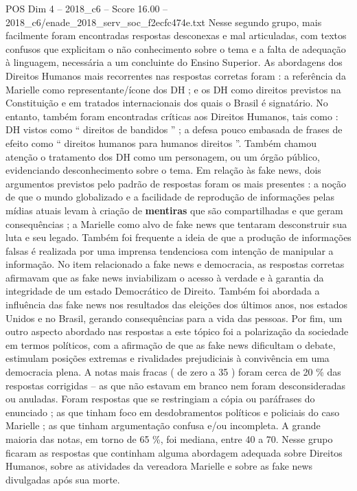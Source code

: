\begin{textsample}{POS Dim 4 – 2018\_c6 – Score 16.00 – 2018\_c6/enade\_2018\_serv\_soc\_f2ecfc474e.txt}
Nesse segundo grupo, mais facilmente foram encontradas respostas desconexas e mal articuladas, com textos confusos que explicitam o não conhecimento sobre o tema e a falta de adequação à linguagem, necessária a um concluinte do Ensino Superior.
As abordagens dos Direitos Humanos mais recorrentes nas respostas corretas foram : a referência da Marielle como representante/ícone dos DH ; e os DH como direitos previstos na Constituição e em tratados internacionais dos quais o Brasil é signatário.
No entanto, também foram encontradas críticas aos Direitos Humanos, tais como : DH vistos como “ direitos de bandidos ” ; a defesa pouco embasada de frases de efeito como “ direitos humanos para humanos direitos ”.
Também chamou atenção o tratamento dos DH como um personagem, ou um órgão público, evidenciando desconhecimento sobre o tema.
Em relação às fake news, dois argumentos previstos pelo padrão de respostas foram os mais presentes : a noção de que o mundo globalizado e a facilidade de reprodução de informações pelas mídias atuais levam à criação de \textbf{mentiras} que são compartilhadas e que geram consequências ; a Marielle como alvo de fake news que tentaram desconstruir sua luta e seu legado.
Também foi frequente a ideia de que a produção de informações falsas é realizada por uma imprensa tendenciosa com intenção de manipular a informação.
No item relacionado a fake news e democracia, as respostas corretas afirmavam que as fake news inviabilizam o acesso à verdade e à garantia da integridade de um estado Democrático de Direito.
Também foi abordada a influência das fake news nos resultados das eleições dos últimos anos, nos estados Unidos e no Brasil, gerando consequências para a vida das pessoas.
Por fim, um outro aspecto abordado nas respostas a este tópico foi a polarização da sociedade em termos políticos, com a afirmação de que as fake news dificultam o debate, estimulam posições extremas e rivalidades prejudiciais à convivência em uma democracia plena.
A notas mais fracas ( de zero a 35 ) foram cerca de 20 \% das respostas corrigidas – as que não estavam em branco nem foram desconsideradas ou anuladas.
Foram respostas que se restringiam a cópia ou paráfrases do enunciado ; as que tinham foco em desdobramentos políticos e policiais do caso Marielle ; as que tinham argumentação confusa e/ou incompleta.
A grande maioria das notas, em torno de 65 \%, foi mediana, entre 40 a 70.
Nesse grupo ficaram as respostas que continham alguma abordagem adequada sobre Direitos Humanos, sobre as atividades da vereadora Marielle e sobre as fake news divulgadas após sua morte.

\end{textsample}
